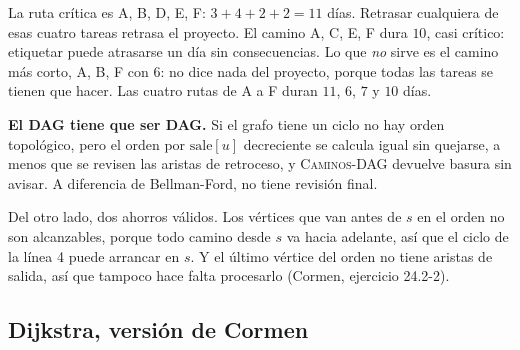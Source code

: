 \documentclass[11pt,letterpaper]{article}
\begin{document}
\begin{ejemplo}
\begin{center}
  \end{center}
  La ruta crítica es A, B, D, E, F: $3 + 4 + 2 + 2 = 11$ días.
  Retrasar cualquiera de esas cuatro tareas retrasa el proyecto. El
  camino A, C, E, F dura $10$, casi crítico: etiquetar puede atrasarse
  un día sin consecuencias. Lo que \emph{no} sirve es el camino más
  corto, A, B, F con $6$: no dice nada del proyecto, porque todas las
  tareas se tienen que hacer. Las cuatro rutas de A a F duran $11$,
  $6$, $7$ y $10$ días.
\end{ejemplo}

\begin{ojo}
  \textbf{El DAG tiene que ser DAG.} Si el grafo tiene un ciclo no hay
  orden topológico, pero el orden por $\text{sale}[u]$ decreciente se
  calcula igual sin quejarse, a menos que se revisen las aristas de
  retroceso, y \textsc{Caminos-DAG} devuelve basura sin avisar. A
  diferencia de Bellman-Ford, no tiene revisión final.

  \smallskip
  Del otro lado, dos ahorros válidos. Los vértices que van antes de
  $s$ en el orden no son alcanzables, porque todo camino desde $s$ va
  hacia adelante, así que el ciclo de la línea 4 puede arrancar en
  $s$. Y el último vértice del orden no tiene aristas de salida, así
  que tampoco hace falta procesarlo (Cormen, ejercicio 24.2-2).
\end{ojo}


\subsection*{Dijkstra, versión de Cormen}
\end{document}
